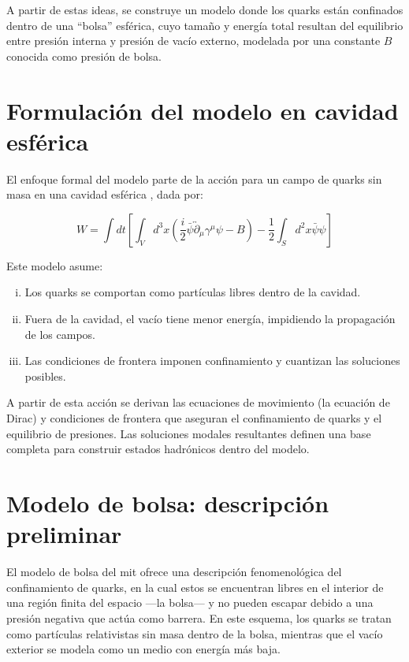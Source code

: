A partir de estas ideas, se construye un modelo donde los quarks están confinados dentro de una “bolsa” esférica, cuyo tamaño y energía total resultan del equilibrio entre presión interna y presión de vacío externo, modelada por una constante \( B \) conocida como presión de bolsa.

\section{Formulación del modelo en cavidad esférica}

El enfoque formal del modelo parte de la acción para un campo de quarks sin masa en una cavidad esférica \cite{DeTar_1983}, dada por:

\begin{equation}
W = \int dt \left[ \int_{V} d^3x \left( \frac{i}{2} \bar{\psi} \overleftrightarrow{\partial}_{\mu} \gamma^{\mu} \psi - B \right) - \frac{1}{2} \int_{S} d^2x \bar{\psi} \psi \right]
\end{equation}

Este modelo asume:

\begin{enumerate}[i.]
\item Los quarks se comportan como partículas libres dentro de la cavidad.
\item Fuera de la cavidad, el vacío tiene menor energía, impidiendo la propagación de los campos.
\item Las condiciones de frontera imponen confinamiento y cuantizan las soluciones posibles.
\end{enumerate}

A partir de esta acción se derivan las ecuaciones de movimiento (la ecuación de Dirac) y condiciones de frontera que aseguran el confinamiento de quarks y el equilibrio de presiones. Las soluciones modales resultantes definen una base completa para construir estados hadrónicos dentro del modelo.

\section{Modelo de bolsa: descripción preliminar}

El modelo de bolsa del \gls{mit} ofrece una descripción fenomenológica del confinamiento de quarks, en la cual estos se encuentran libres en el interior de una región finita del espacio —la bolsa— y no pueden escapar debido a una presión negativa que actúa como barrera. En este esquema, los quarks se tratan como partículas relativistas sin masa dentro de la bolsa, mientras que el vacío exterior se modela como un medio con energía más baja.

